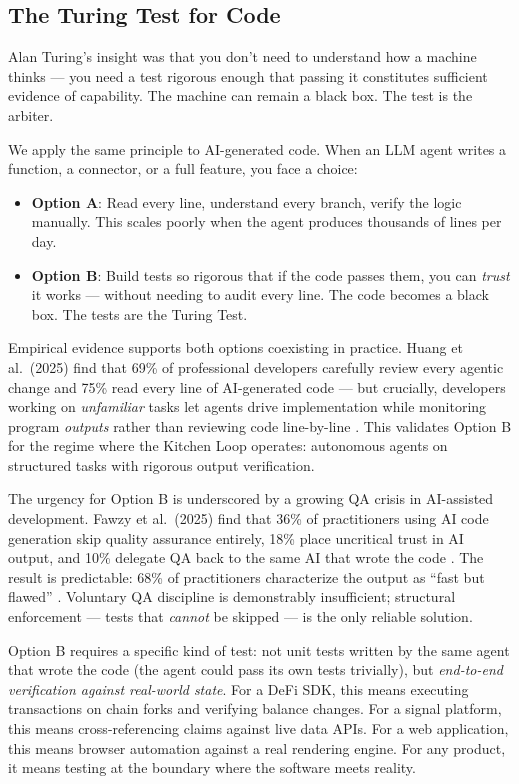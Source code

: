 \documentclass[11pt,a4paper]{article}
\providecommand{\tightlist}{%
  \setlength{\itemsep}{0pt}\setlength{\parskip}{0pt}}
\begin{document}
\subsection{The Turing Test for Code}\label{sec:turing-test-for-code}

Alan Turing's insight was that you don't need to understand how a machine thinks --- you need a test rigorous enough that passing it constitutes sufficient evidence of capability. The machine can remain a black box. The test is the arbiter.

We apply the same principle to AI-generated code. When an LLM agent writes a function, a connector, or a full feature, you face a choice:

\begin{itemize}
\tightlist
\item
  \textbf{Option A}: Read every line, understand every branch, verify the logic manually. This scales poorly when the agent produces thousands of lines per day.
\item
  \textbf{Option B}: Build tests so rigorous that if the code passes them, you can \emph{trust} it works --- without needing to audit every line. The code becomes a black box. The tests are the Turing Test.
\end{itemize}

Empirical evidence supports both options coexisting in practice. Huang et al.~(2025) find that 69\% of professional developers carefully review every agentic change and 75\% read every line of AI-generated code --- but crucially, developers working on \emph{unfamiliar} tasks let agents drive implementation while monitoring program \emph{outputs} rather than reviewing code line-by-line \cite{huang2025}. This validates Option B for the regime where the Kitchen Loop operates: autonomous agents on structured tasks with rigorous output verification.

The urgency for Option B is underscored by a growing QA crisis in AI-assisted development. Fawzy et al.~(2025) find that 36\% of practitioners using AI code generation skip quality assurance entirely, 18\% place uncritical trust in AI output, and 10\% delegate QA back to the same AI that wrote the code \cite{fawzy2025}. The result is predictable: 68\% of practitioners characterize the output as ``fast but flawed'' \cite{fawzy2025}. Voluntary QA discipline is demonstrably insufficient; structural enforcement --- tests that \emph{cannot} be skipped --- is the only reliable solution.

Option B requires a specific kind of test: not unit tests written by the same agent that wrote the code (the agent could pass its own tests trivially), but \emph{end-to-end verification against real-world state}. For a DeFi SDK, this means executing transactions on chain forks and verifying balance changes. For a signal platform, this means cross-referencing claims against live data APIs. For a web application, this means browser automation against a real rendering engine. For any product, it means testing at the boundary where the software meets reality.
\end{document}
